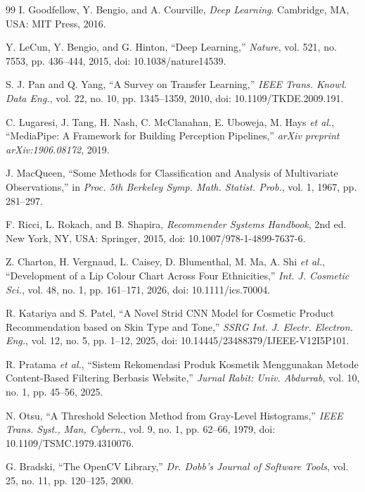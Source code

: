 \documentclass[10pt,a4paper]{article}
\begin{document}
\begin{thebibliography}{99}
I. Goodfellow, Y. Bengio, and A. Courville, \textit{Deep Learning}. Cambridge, MA, USA: MIT Press, 2016.

Y. LeCun, Y. Bengio, and G. Hinton, ``Deep Learning,'' \textit{Nature}, vol. 521, no. 7553, pp. 436--444, 2015, doi: 10.1038/nature14539.

S. J. Pan and Q. Yang, ``A Survey on Transfer Learning,'' \textit{IEEE Trans. Knowl. Data Eng.}, vol. 22, no. 10, pp. 1345--1359, 2010, doi: 10.1109/TKDE.2009.191.

C. Lugaresi, J. Tang, H. Nash, C. McClanahan, E. Uboweja, M. Hays \textit{et al.}, ``MediaPipe: A Framework for Building Perception Pipelines,'' \textit{arXiv preprint arXiv:1906.08172}, 2019.

J. MacQueen, ``Some Methods for Classification and Analysis of Multivariate Observations,'' in \textit{Proc. 5th Berkeley Symp. Math. Statist. Prob.}, vol. 1, 1967, pp. 281--297.

F. Ricci, L. Rokach, and B. Shapira, \textit{Recommender Systems Handbook}, 2nd ed. New York, NY, USA: Springer, 2015, doi: 10.1007/978-1-4899-7637-6.

Z. Charton, H. Vergnaud, L. Caisey, D. Blumenthal, M. Ma, A. Shi \textit{et al.}, ``Development of a Lip Colour Chart Across Four Ethnicities,'' \textit{Int. J. Cosmetic Sci.}, vol. 48, no. 1, pp. 161--171, 2026, doi: 10.1111/ics.70004.

R. Katariya and S. Patel, ``A Novel Strid CNN Model for Cosmetic Product Recommendation based on Skin Type and Tone,'' \textit{SSRG Int. J. Electr. Electron. Eng.}, vol. 12, no. 5, pp. 1--12, 2025, doi: 10.14445/23488379/IJEEE-V12I5P101.

R. Pratama \textit{et al.}, ``Sistem Rekomendasi Produk Kosmetik Menggunakan Metode Content-Based Filtering Berbasis Website,'' \textit{Jurnal Rabit: Univ. Abdurrab}, vol. 10, no. 1, pp. 45--56, 2025.

N. Otsu, ``A Threshold Selection Method from Gray-Level Histograms,'' \textit{IEEE Trans. Syst., Man, Cybern.}, vol. 9, no. 1, pp. 62--66, 1979, doi: 10.1109/TSMC.1979.4310076.

G. Bradski, ``The OpenCV Library,'' \textit{Dr. Dobb's Journal of Software Tools}, vol. 25, no. 11, pp. 120--125, 2000.


\end{thebibliography}
\end{document}
